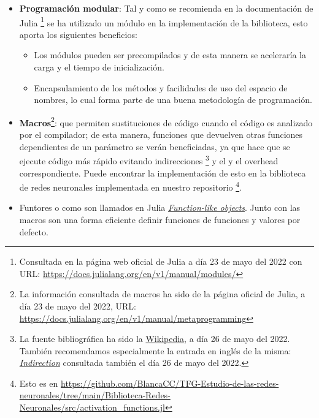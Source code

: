 
\begin{itemize}
    \item \textbf{Programación modular}: Tal y como se recomienda en la documentación de Julia \footnote{
        Consultada en la página web oficial de Julia  a día 23 de mayo del 2022 con URL: \url{https://docs.julialang.org/en/v1/manual/modules/}
    } se ha utilizado un módulo en la implementación de la biblioteca, esto aporta los siguientes beneficios: 
    \begin{itemize}
        \item Los módulos pueden ser precompilados y de esta manera se aceleraría la carga y el tiempo de inicialización. 
        \item Encapsulamiento de los métodos y facilidades de uso del espacio de nombres, lo cual forma parte
        de una buena metodología de programación. 
    \end{itemize}

    \item \textbf{Macros}\footnote{La información consultada de macros ha sido  de la página oficial de Julia, a día 23 de mayo del 2022, URL:
    \url{https://docs.julialang.org/en/v1/manual/metaprogramming}}:
    que permiten sustituciones de código cuando el código es analizado por el compilador; 
    de esta manera, funciones que devuelven otras funciones dependientes de un parámetro se verán beneficiadas,
    ya que hace que se ejecute código más rápido evitando indirecciones \footnote{La fuente bibliográfica ha sido la \href{https://es.wikipedia.org/wiki/Indirección}{Wikipedia}, a día 26 de mayo del 2022.
    También recomendamos especialmente la entrada en inglés de la misma:
    \href{https://en.wikipedia.org/wiki/Indirection}{\textit{Indirection}}
    consultada también el día 26 de mayo del 2022.
    }  y el y el overhead correspondiente. 
     Puede encontrar la implementación de esto en la biblioteca de redes neuronales implementada en nuestro 
     repositorio 
     \footnote{
         Esto es en \url{https://github.com/BlancaCC/TFG-Estudio-de-las-redes-neuronales/tree/main/Biblioteca-Redes-Neuronales/src/activation_functions.jl}
     }.

     \item Funtores o como son llamados en Julia \href{https://docs.julialang.org/en/v1/manual/methods/#Function-like-objects}{\textit{Function-like objects}}. Junto con las macros son una forma eficiente definir funciones de funciones y valores por defecto. 
\end{itemize}

